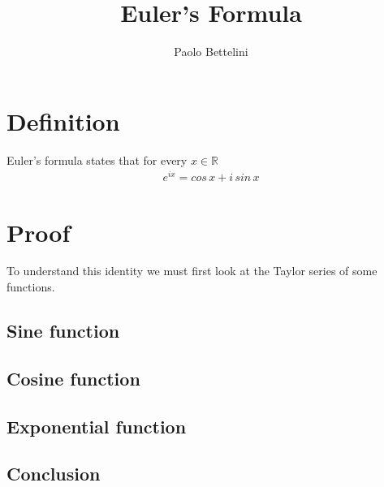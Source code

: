 \documentclass{article}
\title{Euler's Formula}
\author{Paolo Bettelini}
\date{}
\begin{document}
\maketitle
\tableofcontents
\pagebreak

\section{Definition}

Euler's formula states that for every \(x\in\mathbb{R}\)
\begin{align*}
    e^{ix}=cos\,x+i\,sin\,x
\end{align*}

\section{Proof}

To understand this identity we must first look at the Taylor series of some functions.

\subsection{Sine function}
\subsection{Cosine function}
\subsection{Exponential function}

\pagebreak

\subsection{Conclusion}
\end{document}
